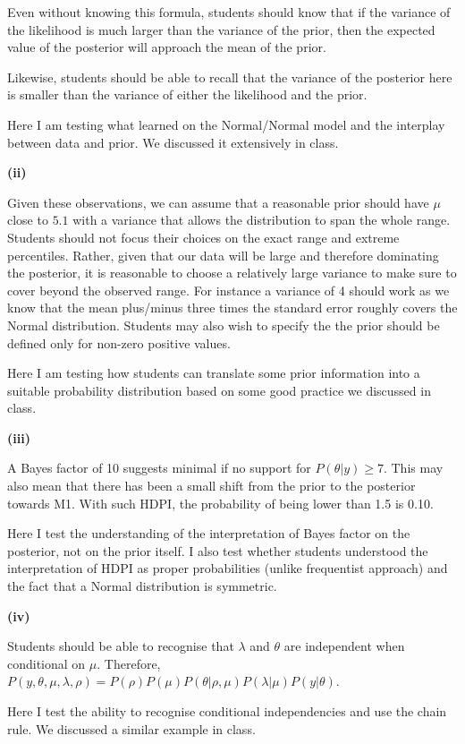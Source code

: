 \documentclass{article}
\begin{document}
Even without knowing this formula, students should know that if the variance of the likelihood is much larger than the variance of the prior, then the expected value of the posterior will approach the mean of the prior.

Likewise, students should be able to recall that the variance of the posterior here is smaller than the variance of either the likelihood and the prior.

Here I am testing what learned on the Normal/Normal model and the interplay between data and prior.
We discussed it extensively in class.

\textbf{(ii)}

Given these observations, we can assume that a reasonable prior should have $\mu$ close to $5.1$ with a variance that allows the distribution to span the whole range.
Students should not focus their choices on the exact range and extreme percentiles.
Rather, given that our data will be large and therefore dominating the posterior, it is reasonable to choose a relatively large variance to make sure to cover beyond the observed range.
For instance a variance of 4 should work as we know that the mean plus/minus three times the standard error roughly covers the Normal distribution.
Students may also wish to specify the the prior should be defined only for non-zero positive values.

Here I am testing how students can translate some prior information into a suitable probability distribution based on some good practice we discussed in class.

\textbf{(iii)}

A Bayes factor of 10 suggests minimal if no support for $P(\theta | y) \geq 7$. This may also mean that there has been a small shift from the prior to the posterior towards M1.
With such HDPI, the probability of being lower than 1.5 is 0.10.

Here I test the understanding of the interpretation of Bayes factor on the posterior, not on the prior itself.
I also test whether students understood the interpretation of HDPI as proper probabilities (unlike frequentist approach) and the fact that a Normal distribution is symmetric.


\textbf{(iv)}

Students should be able to recognise that $\lambda$ and $\theta$ are independent when conditional on $\mu$.
Therefore,
$P(y,\theta,\mu,\lambda,\rho) = P(\rho) P(\mu) P(\theta | \rho, \mu) P(\lambda | \mu) P(y | \theta) $.

Here I test the ability to recognise conditional independencies and use the chain rule.
We discussed a similar example in class.
\end{document}
